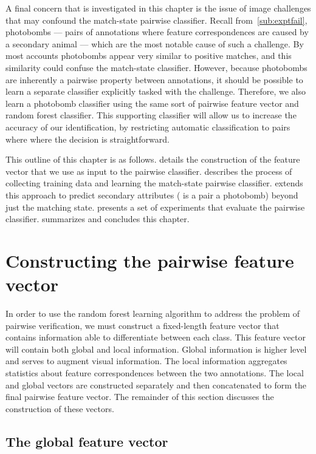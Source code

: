 A final concern that is investigated in this chapter is the issue of image challenges that may confound the
  match-state pairwise classifier.
Recall from~\cref{sub:exptfail}, {photobombs} --- pairs of annotations where feature correspondences are caused
  by a secondary animal --- which are the most notable cause of such a challenge.
By most accounts photobombs appear very similar to positive matches, and this similarity could confuse the
  match-state classifier.
However, because photobombs are inherently a pairwise property between annotations, it should be possible to
  learn a separate classifier explicitly tasked with the challenge.
Therefore, we also learn a photobomb classifier using the same sort of pairwise feature vector and random forest
  classifier.
This supporting classifier will allow us to increase the accuracy of our identification, by restricting automatic
  classification to pairs where where the decision is straightforward.


This outline of this chapter is as follows.
 details the construction of the feature vector that we use as input to the pairwise
  classifier.
 describes the process of collecting training data and learning the match-state pairwise
  classifier.
 extends this approach to predict secondary attributes (\eg{} is a pair a photobomb) beyond
  just the matching state.
 presents a set of experiments that evaluate the pairwise classifier.
 summarizes and concludes this chapter.


\section{Constructing the pairwise feature vector}\label{sec:pairfeat}

In order to use the random forest learning algorithm to address the problem of pairwise verification, we must
  construct a fixed-length feature vector that contains information able to differentiate between each class.
This feature vector will contain both global and local information.
Global information is higher level and serves to augment visual information.
The local information aggregates statistics about feature correspondences between the two annotations.
The local and global vectors are constructed separately and then concatenated to form the final pairwise feature
  vector.
The remainder of this section discusses the construction of these vectors.

\subsection{The global feature vector}

